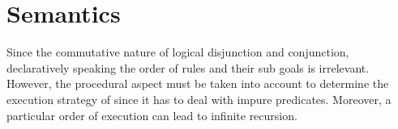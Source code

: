 \documentclass[thesis-solanki.tex]{subfiles}
\begin{document}

\section{Semantics}

Since the commutative nature of logical disjunction and conjunction, declaratively speaking the order of rules and
their sub goals is irrelevant.
However, the procedural aspect must be taken into account to determine the execution strategy of 
since it has to deal with impure predicates.
Moreover, a particular order of execution can lead to infinite recursion.
\end{document}
